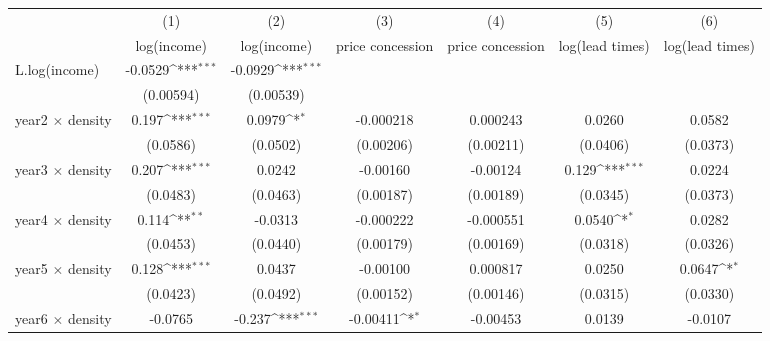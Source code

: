 {
\def\sym#1{\ifmmode^{#1}\else\(^{#1}\)\fi}
\begin{tabular}{l*{6}{c}}
\toprule
            &\multicolumn{1}{c}{(1)}&\multicolumn{1}{c}{(2)}&\multicolumn{1}{c}{(3)}&\multicolumn{1}{c}{(4)}&\multicolumn{1}{c}{(5)}&\multicolumn{1}{c}{(6)}\\
            &\multicolumn{1}{c}{log(income)}&\multicolumn{1}{c}{log(income)}&\multicolumn{1}{c}{price concession}&\multicolumn{1}{c}{price concession}&\multicolumn{1}{c}{log(lead times)}&\multicolumn{1}{c}{log(lead times)}\\
\midrule
L.log(income) &     -0.0529\sym{***}&     -0.0929\sym{***}&                     &                     &                     &                     \\
            &   (0.00594)         &   (0.00539)         &                     &                     &                     &                     \\
\addlinespace
year2 $\times$ density&       0.197\sym{***}&      0.0979\sym{*}  &   -0.000218         &    0.000243         &      0.0260         &      0.0582         \\
            &    (0.0586)         &    (0.0502)         &   (0.00206)         &   (0.00211)         &    (0.0406)         &    (0.0373)         \\
\addlinespace
year3 $\times$ density&       0.207\sym{***}&      0.0242         &    -0.00160         &    -0.00124         &       0.129\sym{***}&      0.0224         \\
            &    (0.0483)         &    (0.0463)         &   (0.00187)         &   (0.00189)         &    (0.0345)         &    (0.0373)         \\
\addlinespace
year4 $\times$ density&       0.114\sym{**} &     -0.0313         &   -0.000222         &   -0.000551         &      0.0540\sym{*}  &      0.0282         \\
            &    (0.0453)         &    (0.0440)         &   (0.00179)         &   (0.00169)         &    (0.0318)         &    (0.0326)         \\
\addlinespace
year5 $\times$ density&       0.128\sym{***}&      0.0437         &    -0.00100         &    0.000817         &      0.0250         &      0.0647\sym{*}  \\
            &    (0.0423)         &    (0.0492)         &   (0.00152)         &   (0.00146)         &    (0.0315)         &    (0.0330)         \\
\addlinespace
year6 $\times$ density&     -0.0765         &      -0.237\sym{***}&    -0.00411\sym{*}  &    -0.00453         &      0.0139         &     -0.0107         \\

\end{tabular}}
